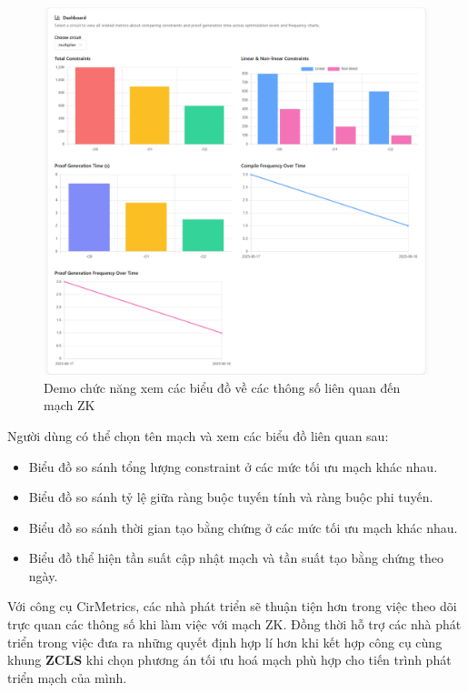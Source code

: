 \begin{figure}[H]
    \centering
    \includegraphics[width=\textwidth]{imgs/dashboardscreen.png}
    \caption{Demo chức năng xem các biểu đồ về các thông số liên quan đến mạch ZK}
    \label{fig:chapter6-dashboardscreen}
\end{figure}

Người dùng có thể chọn tên mạch và xem các biểu đồ liên quan sau:
\begin{itemize}
    \item Biểu đồ so sánh tổng lượng constraint ở các mức tối ưu mạch khác nhau.
    \item Biểu đồ so sánh tỷ lệ giữa ràng buộc tuyến tính và ràng buộc phi tuyến.
    \item Biểu đồ so sánh thời gian tạo bằng chứng ở các mức tối ưu mạch khác nhau.
    \item Biểu đồ thể hiện tần suất cập nhật mạch và tần suất tạo bằng chứng theo ngày.
\end{itemize}

Với công cụ CirMetrics, các nhà phát triển sẽ thuận tiện hơn trong việc theo dõi trực quan các thông số khi làm việc với mạch ZK. Đồng thời hỗ trợ các nhà phát triển trong việc đưa ra những quyết định hợp lí hơn khi kết hợp công cụ cùng khung \textbf{ZCLS} khi chọn phương án tối ưu hoá mạch phù hợp cho tiến trình phát triển mạch của mình.